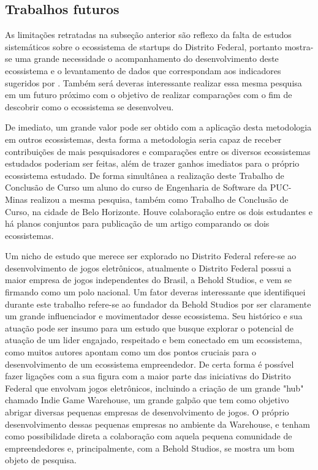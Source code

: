 \subsection{Trabalhos futuros}
\label{subsection:trabalhos_futuros}

As limitações retratadas na subseção anterior são reflexo da falta de estudos sistemáticos sobre o ecossistema de startups do Distrito Federal, portanto mostra-se uma grande necessidade o acompanhamento do desenvolvimento deste ecossistema e o levantamento de dados que correspondam aos indicadores sugeridos por . Também será deveras interessante realizar essa mesma pesquisa em um futuro próximo com o objetivo de realizar comparações com o fim de descobrir como o ecossistema se desenvolveu.

De imediato, um grande valor pode ser obtido com a aplicação desta metodologia em outros ecossistemas, desta forma a metodologia seria capaz de receber contribuições de mais pesquisadores e comparações entre os diversos ecossistemas estudados poderiam ser feitas, além de trazer ganhos imediatos para o próprio ecossistema estudado. De forma simultânea a realização deste Trabalho de Conclusão de Curso um aluno do curso de Engenharia de Software da PUC-Minas realizou a mesma pesquisa, também como Trabalho de Conclusão de Curso, na cidade de Belo Horizonte. Houve colaboração entre os dois estudantes e há planos conjuntos para publicação de um artigo comparando os dois ecossistemas.

Um nicho de estudo que merece ser explorado no Distrito Federal refere-se ao desenvolvimento de jogos eletrônicos, atualmente o Distrito Federal possui a maior empresa de jogos independentes do Brasil, a Behold Studios, e vem se firmando como um polo nacional. Um fator deveras interessante que identifiquei durante este trabalho refere-se ao fundador da Behold Studios por ser claramente um grande influenciador e movimentador desse ecossistema. Seu histórico e sua atuação pode ser insumo para um estudo que busque explorar o potencial de atuação de um lider engajado, respeitado e bem conectado em um ecossistema, como muitos autores apontam como um dos pontos cruciais para o desenvolvimento de um ecossistema empreendedor. De certa forma é possível fazer ligações com a sua figura com a maior parte das iniciativas do Distrito Federal que envolvam jogos eletrônicos, incluindo a criação de um grande "hub" chamado Indie Game Warehouse, um grande galpão que tem como objetivo abrigar diversas pequenas empresas de desenvolvimento de jogos. O próprio desenvolvimento dessas pequenas empresas no ambiente da Warehouse, e tenham como possibilidade direta a colaboração com aquela pequena comunidade de empreendedores e, principalmente, com a Behold Studios, se mostra um bom objeto de pesquisa.

